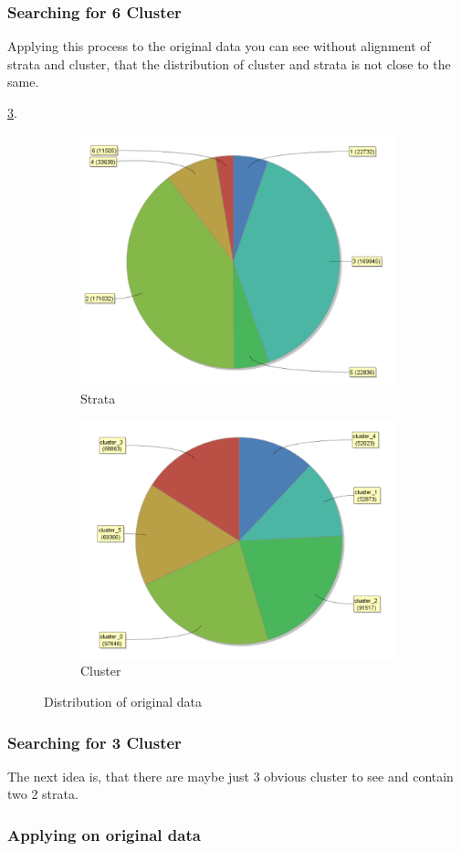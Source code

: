 \subsubsection{Searching for 6 Cluster}
Applying this process to the original data you can see without alignment of strata and cluster, that the distribution of cluster and strata is not close to the same.

\ref{fig:OrgDist}. 
\begin{figure}
\centering
\begin{subfigure}{.5\textwidth}
  \centering
  \includegraphics[width=.4\linewidth]{ClusterPCAOrigRapidStrata.PNG}
  \caption{Strata}
  \label{fig:OrgSt}
\end{subfigure}%
\begin{subfigure}{.5\textwidth}
  \centering
  \includegraphics[width=.4\linewidth]{ClusterPCAOrigRapidCluster.PNG}
  \caption{Cluster}
  \label{fig:OrgCl}
\end{subfigure}
\caption{Distribution of original data}
\label{fig:OrgDist}
\end{figure}

\subsubsection{Searching for 3 Cluster}

The next idea is, that there are maybe just 3 obvious cluster to see and contain two 2 strata.

\subsubsection{Applying on original data}

